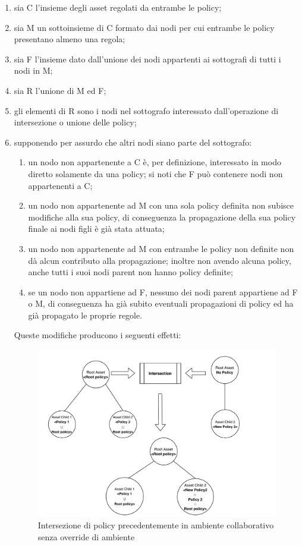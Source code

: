 \documentclass[12pt,a4paper,twoside]{book}
\begin{document}
\begin{enumerate}
\item sia C l'insieme degli asset regolati da entrambe le policy;
\item sia M un sottoinsieme di C formato dai nodi per cui entrambe le policy presentano almeno una regola;
\item sia F l'insieme dato dall'unione dei nodi appartenti ai sottografi di tutti i nodi in M;
\item sia R l'unione di M ed F;
\item gli elementi di R sono i nodi nel sottografo interessato dall'operazione di intersezione o unione delle policy;
\item supponendo per assurdo che altri nodi siano parte del sottografo:
\begin{enumerate}
\item un nodo non appartenente a C è, per definizione, interessato in modo diretto solamente da una policy; si noti che F può contenere nodi non appartenenti a C;
\item un nodo non appartenente ad M con una sola policy definita non subisce modifiche alla sua policy, di conseguenza la propagazione della sua policy finale ai nodi figli è già stata attuata;
\item un nodo non appartenente ad M con entrambe le policy non definite non dà alcun contributo alla propagazione; inoltre non avendo alcuna policy, anche tutti i suoi nodi parent non hanno policy definite;
\item se un nodo non appartiene ad F, nessuno dei nodi parent appartiene ad F o M, di conseguenza ha già subito eventuali propagazioni di policy ed ha già propagato le proprie regole.
\end{enumerate}
Queste modifiche producono i seguenti effetti:
\begin{figure}[H]
\centering
\includegraphics[scale=0.6]{../immagini/correctProp.pdf}
\caption{Intersezione di policy precedentemente in ambiente collaborativo senza override di ambiente}
\label{correctProp}
\end{figure}
\end{enumerate}
\end{document}
